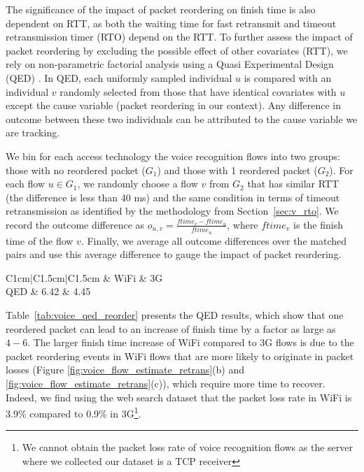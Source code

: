 The significance of the impact of packet reordering on finish time is also dependent on RTT, as both the waiting time for fast retransmit and timeout retransmission timer (\ie RTO) depend on the RTT. To further assess the impact of packet reordering by excluding the possible effect of other covariates (\eg RTT), we rely on non-parametric factorial analysis using a Quasi Experimental Design (QED) \cite{krishnan2013video}. In QED, each uniformly sampled individual $u$ is compared with an individual $v$ randomly selected from those that have identical covariates with $u$ except the cause variable (packet reordering in our context). Any difference in outcome between these two individuals can be attributed to the cause variable we are tracking.

We bin for each access technology the voice recognition flows into two groups: those with no reordered packet ($G_1$) and those with 1 reordered packet ($G_2$). For each flow $u \in G_1$, we randomly choose a flow $v$ from $G_2$ that has similar RTT (\ie the difference is less than 40 ms) and the same condition in terms of timeout retransmission as identified by the methodology from Section~\ref{sec:v_rto}. We record the outcome difference as $o_{u,v} = \frac{ftime_{v} - ftime_{u}}{ftime_{u}}$, where $ftime_v$ is the finish time of the flow $v$. Finally, we average all outcome differences over the matched pairs and use this average difference to gauge the impact of packet reordering.

\begin{table}[th]
\caption{QED results for the impact of packet reordering.}
\label{tab:voice_qed_reorder}
\centering
\renewcommand{\arraystretch}{1}
\begin{tabular}{C{1cm}|C{1.5cm}|C{1.5cm}}
	\hline
	 & WiFi & 3G \\
	\hline
	QED & 6.42 & 4.45 \\
	\hline
\end{tabular}
\end{table}

Table~\ref{tab:voice_qed_reorder} presents the QED results, which show that one reordered packet can lead to an increase of finish time by a factor as large as $4-6$. The larger finish time increase of WiFi compared to 3G flows is due to the packet reordering events in WiFi flows that are more likely to originate in packet losses (\ie Figure \ref{fig:voice_flow_estimate_retrans}(b) and \ref{fig:voice_flow_estimate_retrans}(c)), which require more time to recover. Indeed, we find using the web search dataset that the packet loss rate in WiFi is 3.9\% compared to 0.9\% in 3G\footnote{We cannot obtain the packet loss rate of voice recognition flows as the server where we collected our dataset is a TCP receiver}. 

